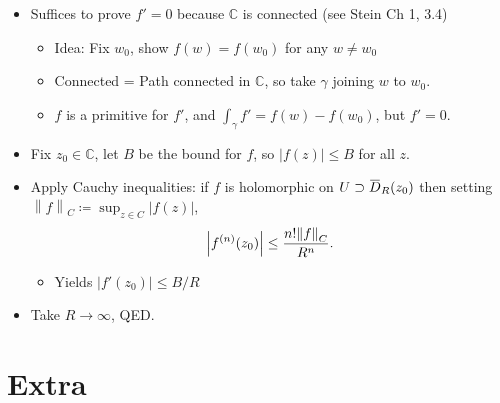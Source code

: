 \begin{solution}

\hfill

\begin{concept}

\hfill

\end{concept}

\begin{itemize}
\tightlist
\item
  Suffices to prove \(f' = 0\) because \({\mathbb{C}}\) is connected
  (see Stein Ch 1, 3.4)

  \begin{itemize}
  \tightlist
  \item
    Idea: Fix \(w_0\), show \(f(w) = f(w_0)\) for any \(w\neq w_0\)
  \item
    Connected = Path connected in \({\mathbb{C}}\), so take \(\gamma\)
    joining \(w\) to \(w_0\).
  \item
    \(f\) is a primitive for \(f'\), and
    \(\int_\gamma f' = f(w) - f(w_0)\), but \(f'=0\).
  \end{itemize}
\item
  Fix \(z_0\in {\mathbb{C}}\), let \(B\) be the bound for \(f\), so
  \({\left\lvert {f(z)} \right\rvert} \leq B\) for all \(z\).
\item
  Apply Cauchy inequalities: if \(f\) is holomorphic on
  \(U\supset \mkern 1.5mu\overline{\mkern-1.5muD\mkern-1.5mu}\mkern 1.5mu_R(z_0)\)
  then setting
  \({\left\lVert {f} \right\rVert}_C \coloneqq\sup_{z\in C} {\left\lvert {f(z)} \right\rvert}\),
  \begin{align*}     {\left\lvert {f^{(n)} (z_0)} \right\rvert} \leq {n! {\left\lVert {f} \right\rVert}_C \over R^n}     .\end{align*}

  \begin{itemize}
  \tightlist
  \item
    Yields \({\left\lvert { f'(z_0) } \right\rvert} \leq B/R\)
  \end{itemize}
\item
  Take \(R\to \infty\), QED.
\end{itemize}

\end{solution}

\hypertarget{extra}{%
\section{Extra}\label{extra}}

